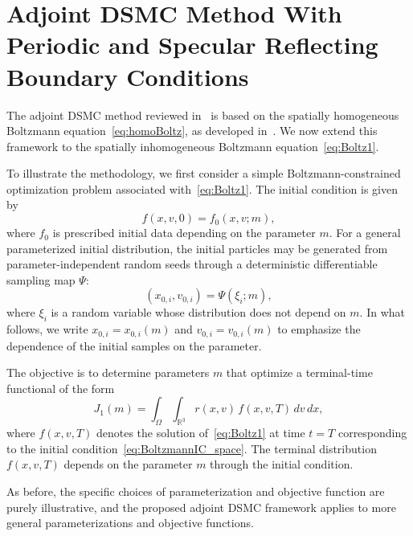\documentclass[12pt,nopreprintline]{elsarticle}
\begin{document}
\section{Adjoint DSMC Method With Periodic and Specular Reflecting Boundary Conditions}\label{sec:adjoint_DSMC_space}

The adjoint DSMC method reviewed in~ is based on the spatially homogeneous Boltzmann equation~\eqref{eq:homoBoltz}, as developed in~\cite{caflisch2021adjoint}. We now extend this framework to the spatially inhomogeneous Boltzmann equation~\eqref{eq:Boltz1}.

{
To illustrate the methodology, we first consider a simple Boltzmann-constrained optimization problem associated with~\eqref{eq:Boltz1}. The initial condition is given by
\begin{equation}
\label{eq:BoltzmannIC_space}
f(x,v,0) = f_0(x,v; m),
\end{equation}
where $f_0$ is prescribed initial data depending on the parameter $m$. For a general parameterized initial distribution, the initial particles may be generated from parameter-independent random seeds through a deterministic differentiable sampling map $\Psi$:
\[
(x_{0,i},v_{0,i})=\Psi(\xi_i;m),
\]
where $\xi_i$ is a random variable whose distribution does not depend on $m$. In what follows, we write $x_{0,i}=x_{0,i}(m)$ and $v_{0,i}=v_{0,i}(m)$ to emphasize the dependence of the initial samples on the parameter.
}


The objective is to determine parameters $m$ that optimize a terminal-time functional of the form
\begin{equation}
\label{eq:OTD_obj_space}
J_1(m) = \int_{\Omega} \int_{\mathbb{R}^3} r(x,v)\, f(x,v,T)\, dv\, dx,
\end{equation}
where $f(x,v,T)$ denotes the solution of~\eqref{eq:Boltz1} at time $t=T$ corresponding to the initial condition~\eqref{eq:BoltzmannIC_space}. The terminal distribution $f(x,v,T)$ depends on the parameter $m$ through the initial condition.

As before, the specific choices of parameterization and objective function are purely illustrative, and the proposed adjoint DSMC framework applies to more general parameterizations and objective functions.
\end{document}
